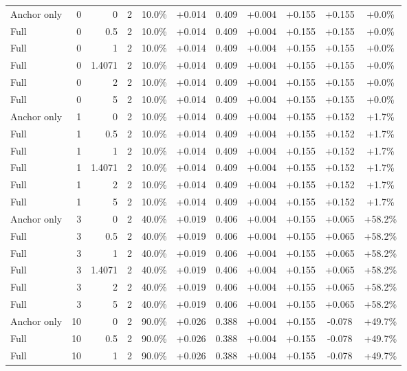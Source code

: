 \begin{table}[htbp]
\begin{tabular}{lrrrccccccc}
Anchor only & 0 & 0 & 2 & 10.0\% & +0.014 & 0.409 & +0.004 & +0.155 & +0.155 & +0.0\% \\
Full & 0 & 0.5 & 2 & 10.0\% & +0.014 & 0.409 & +0.004 & +0.155 & +0.155 & +0.0\% \\
Full & 0 & 1 & 2 & 10.0\% & +0.014 & 0.409 & +0.004 & +0.155 & +0.155 & +0.0\% \\
Full & 0 & 1.4071 & 2 & 10.0\% & +0.014 & 0.409 & +0.004 & +0.155 & +0.155 & +0.0\% \\
Full & 0 & 2 & 2 & 10.0\% & +0.014 & 0.409 & +0.004 & +0.155 & +0.155 & +0.0\% \\
Full & 0 & 5 & 2 & 10.0\% & +0.014 & 0.409 & +0.004 & +0.155 & +0.155 & +0.0\% \\
Anchor only & 1 & 0 & 2 & 10.0\% & +0.014 & 0.409 & +0.004 & +0.155 & +0.152 & +1.7\% \\
Full & 1 & 0.5 & 2 & 10.0\% & +0.014 & 0.409 & +0.004 & +0.155 & +0.152 & +1.7\% \\
Full & 1 & 1 & 2 & 10.0\% & +0.014 & 0.409 & +0.004 & +0.155 & +0.152 & +1.7\% \\
Full & 1 & 1.4071 & 2 & 10.0\% & +0.014 & 0.409 & +0.004 & +0.155 & +0.152 & +1.7\% \\
Full & 1 & 2 & 2 & 10.0\% & +0.014 & 0.409 & +0.004 & +0.155 & +0.152 & +1.7\% \\
Full & 1 & 5 & 2 & 10.0\% & +0.014 & 0.409 & +0.004 & +0.155 & +0.152 & +1.7\% \\
Anchor only & 3 & 0 & 2 & 40.0\% & +0.019 & 0.406 & +0.004 & +0.155 & +0.065 & +58.2\% \\
Full & 3 & 0.5 & 2 & 40.0\% & +0.019 & 0.406 & +0.004 & +0.155 & +0.065 & +58.2\% \\
Full & 3 & 1 & 2 & 40.0\% & +0.019 & 0.406 & +0.004 & +0.155 & +0.065 & +58.2\% \\
Full & 3 & 1.4071 & 2 & 40.0\% & +0.019 & 0.406 & +0.004 & +0.155 & +0.065 & +58.2\% \\
Full & 3 & 2 & 2 & 40.0\% & +0.019 & 0.406 & +0.004 & +0.155 & +0.065 & +58.2\% \\
Full & 3 & 5 & 2 & 40.0\% & +0.019 & 0.406 & +0.004 & +0.155 & +0.065 & +58.2\% \\
Anchor only & 10 & 0 & 2 & 90.0\% & +0.026 & 0.388 & +0.004 & +0.155 & -0.078 & +49.7\% \\
Full & 10 & 0.5 & 2 & 90.0\% & +0.026 & 0.388 & +0.004 & +0.155 & -0.078 & +49.7\% \\
Full & 10 & 1 & 2 & 90.0\% & +0.026 & 0.388 & +0.004 & +0.155 & -0.078 & +49.7\% \\

\end{tabular}
\end{table}
